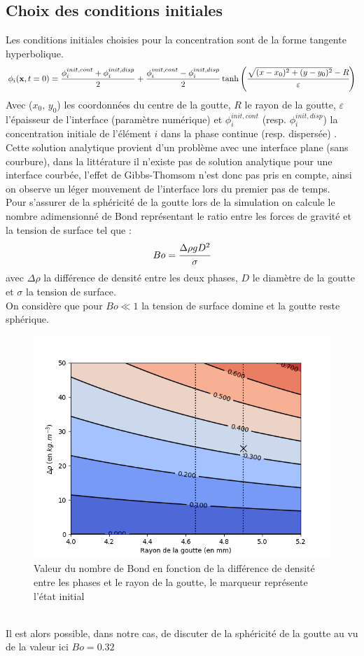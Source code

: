 \documentclass[a4paper,11pt,fleqn]{report}    %
\begin{document}
\subsection{Choix des conditions initiales}
Les conditions initiales choisies pour la concentration sont de la forme tangente hyperbolique.
\begin{equation}
	\phi_{i}(\mathbf{x},t=0) = \frac{\phi^{init,cont}_i + \phi^{init,disp}_i  }{2} +  \frac{\phi^{init,cont}_i - \phi^{init,disp}_i }{2}\tanh\left(\cfrac{\sqrt{(x-x_0)^2+(y-y_0)^2}-R}{\varepsilon} \right)
\end{equation}
Avec ($x_0$, $y_0$) les coordonnées du centre de la goutte, $R$ le rayon de la goutte, $\varepsilon$ l'épaisseur de l'interface (paramètre numérique) et $\phi_i^{init,cont}$ (resp. $\phi_i^{init,disp}$) la concentration initiale de l'élément $i$ dans la phase continue (resp. dispersée) .\\
Cette solution analytique provient d'un problème avec une interface plane (sans courbure), dans la littérature il n'existe pas de solution analytique pour une interface courbée, l'effet de Gibbs-Thomsom n'est donc pas pris en compte, ainsi on observe un léger mouvement de l'interface lors du premier pas de temps. \\
Pour s'assurer de la sphéricité de la goutte lors de la simulation on calcule le nombre adimensionné de Bond  représentant le ratio entre les forces de gravité et la tension de surface tel que :
\begin{equation}
	Bo = \cfrac{\Delta \rho g D^2}{\sigma}
\end{equation}
avec $\Delta\rho$ la différence de densité entre les deux phases, $D$ le diamètre de la goutte et $\sigma$ la tension de surface.\\
On considère que pour $Bo \ll 1$ la tension de surface domine et la goutte reste sphérique.
\begin{figure}[h!]
	\centering
	\includegraphics[width=0.7\linewidth]{figure/contour_bond}
	\caption[Valeur du nombre de Bond en fonction de la différence de densité et de la tension de surface entre les phases]{Valeur du nombre de Bond en fonction de la différence de densité entre les phases et le rayon de la goutte, le marqueur représente l'état initial}
	\label{fig:contourbond}
\end{figure}\\
Il est alors possible, dans notre cas, de discuter de la sphéricité de la goutte au vu de la valeur ici $Bo = 0.32$




\newpage
\printbibliography
\end{document}
